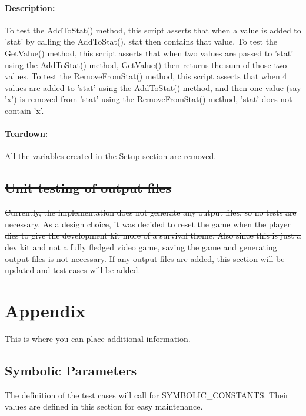 \documentclass[12pt, titlepage]{article}
\DeclareRobustCommand{\hsout}[1]{\texorpdfstring{\sout{#1}}{#1}}
\begin{document}
\paragraph{Description: }
To test the AddToStat() method, this script asserts that when a value is added to 'stat' by calling the AddToStat(), stat then contains that value.
\newline
To test the GetValue() method, this script asserts that when two values are passed to 'stat' using the AddToStat() method, GetValue() then returns the sum of those two values.
\newline
To test the RemoveFromStat() method, this script asserts that when 4 values are added to 'stat' using the AddToStat() method, and then one value (say 'x') is removed from 'stat' using the RemoveFromStat() method, 'stat' does not contain 'x'.
\paragraph{Teardown: } All the variables created in the Setup section are removed.
\subsection{\hsout{Unit testing of output files}}		

\sout{Currently, the implementation does not generate any output files, so no tests are necessary. As a design choice, it was decided to reset the game when the player dies to give the development kit more of a survival theme. Also since this is just a dev kit and not a fully fledged video game, saving the game and generating output files is not necessary. If any output files are added, this section will be updated and test cases will be added.}



%
%
%
%
%
\newpage
\section{Appendix}

This is where you can place additional information.

\subsection{Symbolic Parameters}

The definition of the test cases will call for SYMBOLIC\_CONSTANTS.
Their values are defined in this section for easy maintenance.
\end{document}
